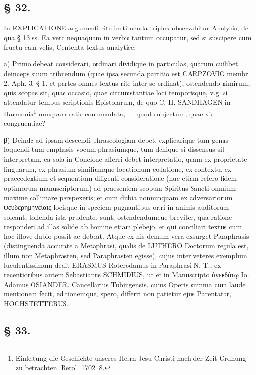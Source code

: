 \subsection*{§ 32.}

In EXPLICATIONE argumenti rite instituenda triplex observabitur Analysis, de qua § 13 ss. Ea vero nequaquam in verbis tantum occupatur, sed si suscipere cum fructu eam velis, Contenta textus analytice:

a) Primo debeat considerari, ordinari dividique in particulas, quarum cuilibet deinceps suum tribuendum (quae ipsa secunda partitio est CARPZOVIO membr. 2. Aph. 3. § 1. et partes omnes textus rite inter se ordinat), ostendendo nimirum, quis scopus sit, quae occasio, quae circumstantiae loci temporisque, v.g. si attendatur tempus scriptionis Epistolarum, de quo C. H. SANDHAGEN in Harmonia\footnote{Einleitung die Geschichte unseres Herrn Jesu Christi nach der Zeit-Ordnung zu betrachten. Berol. 1702. 8.}
nunquam satis commendata, — quod subjectum, quae vis congruentiae?

β) Deinde ad ipsam descendi phraseologiam debet, explicarique tum genus loquendi tum emphasis vocum phrasiumque, tum denique si dissensus sit interpretum, ea sola in Concione afferri debet interpretatio, quam ex proprietate linguarum, ex phrasium similiumque locutionum collatione, ex contextu, ex praecedentium et sequentium diligenti consideratione (huc etiam refero fidem optimorum manuscriptorum) ad praesentem scopum Spiritus Sancti omnium maxime collimare perspexeris; et cum dubia nonnunquam ex adversariorum ψευδερημηνείαις locisque in speciem pugnantibus oriri in animis auditorum soleant, tollenda ista prudenter sunt, ostendendumque breviter, qua ratione responderi ad illas solide ab homine etiam plebejo, et qui conciliari textus cum hoc illove dubio possit ac debeat. Atque ex his demum vera exsurget Paraphrasis (distinguenda accurate a Metaphrasi, qualis de LUTHERO Doctorum regula est, illum non Metaphrasten, sed Paraphrasten egisse), cujus inter veteres exemplum luculentissimum dedit ERASMUS Roterodamus in Paraphrasi N. T., ex recentioribus autem Sebastianus SCHMIDIUS, ut et in Manuscripto ἀνεκδότῳ Io. Adamus OSIANDER, Cancellarius Tubingensis, cujus Operis summa cum laude mentionem fecit, editionemque, spero, differri non patietur ejus Parentator, HOCHSTETTERUS.

\subsection*{§ 33.}

